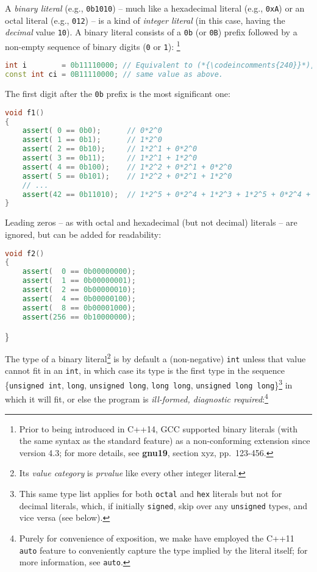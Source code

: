 \documentclass[twoside,10pt,letterpaper,usenames]{newstyle-PearsonGeneric-7-38}
\newcommand{\codeincomments}{\color{skyblue}\ttfamily}
\begin{document}
A \emph{binary literal} (e.g., \texttt{0b1010}) -- much like a
hexadecimal literal (e.g., \texttt{0xA}) or an octal literal (e.g.,
\texttt{012}) -- is a kind of \emph{integer literal} (in this case,
having the \emph{decimal} value \texttt{10}). A binary literal consists
of a \texttt{0b} (or \texttt{0B}) prefix followed by a non-empty
sequence of binary digits (\texttt{0} or \texttt{1}):
{\cprotect\footnote{Prior to being introduced in C++14, GCC supported
binary literals (with the same syntax as the standard feature) as a
non-conforming extension since version 4.3; for more details, see
\textbf{{gnu19}}, section xyz, pp.~123-456.}}

\begin{lstlisting}[language=C++]
int i        = 0b11110000; // Equivalent to (*{\codeincomments{240}}*), (*{\codeincomments{0360}}*), or (*{\codeincomments{0xF0}}*)
const int ci = 0B11110000; // same value as above.
\end{lstlisting}
    

The first digit after the \texttt{0b} prefix is the most significant
one:

\begin{lstlisting}[language=C++]
void f1()
{
    assert( 0 == 0b0);      // 0*2^0
    assert( 1 == 0b1);      // 1*2^0
    assert( 2 == 0b10);     // 1*2^1 + 0*2^0
    assert( 3 == 0b11);     // 1*2^1 + 1*2^0
    assert( 4 == 0b100);    // 1*2^2 + 0*2^1 + 0*2^0
    assert( 5 == 0b101);    // 1*2^2 + 0*2^1 + 1*2^0
    // ...
    assert(42 == 0b11010);  // 1*2^5 + 0*2^4 + 1*2^3 + 1*2^5 + 0*2^4 + 1*2^3
}
\end{lstlisting}
    

Leading zeros -- as with octal and hexadecimal (but not decimal)
literals -- are ignored, but can be added for readability:

\begin{lstlisting}[language=C++]
void f2()
{
    assert(  0 == 0b00000000);
    assert(  1 == 0b00000001);
    assert(  2 == 0b00000010);
    assert(  4 == 0b00000100);
    assert(  8 == 0b00001000);
    assert(256 == 0b10000000);
\end{lstlisting}
    

\}

The type of a binary literal{\cprotect\footnote{Its \emph{value
category} is \emph{prvalue} like every other integer literal.}} is by
default a (non-negative) \texttt{int} unless that value cannot fit in an
\texttt{int}, in which case its type is the first type in the sequence
\{\texttt{unsigned int}, \texttt{long}, \texttt{unsigned long},
\texttt{long long}, \texttt{unsigned long long}\}{\cprotect\footnote{This
same type list applies for both \texttt{octal} and \texttt{hex}
literals but not for decimal literals, which, if initially
\texttt{signed}, skip over any \texttt{unsigned} types, and vice versa
(see below).}} in which it will fit, or else the program is
\emph{ill-formed, diagnostic required}:{\cprotect\footnote{Purely for
convenience of exposition, we make have employed the C++11
\texttt{auto} feature to conveniently capture the type implied by the
literal itself; for more information, see \texttt{auto}.}}
\end{document}
